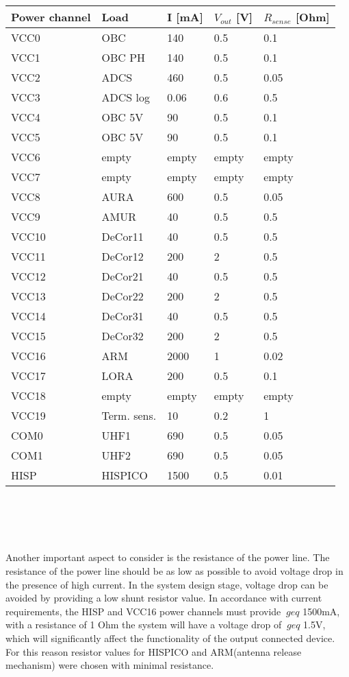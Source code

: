   
   \begin{tabular}{p{3cm}p{3cm}p{2cm}p{2cm}p{3cm}} \toprule
   	Power channel & Load & I [mA] & $V_{out}$ [V] & $R_{sense}$ [Ohm]\\ \midrule
   VCC0 & OBC & 140 & 0.5 & 0.1\\
   VCC1 & OBC PH & 140 & 0.5 & 0.1\\
   VCC2 & ADCS & 460 & 0.5 & 0.05\\
   VCC3 & ADCS log & 0.06 & 0.6 & 0.5\\
   VCC4 & OBC 5V & 90 & 0.5 & 0.1\\
   VCC5 & OBC 5V & 90 & 0.5 & 0.1\\
   VCC6 & empty & empty & empty & empty\\
   VCC7 & empty & empty & empty & empty\\
   VCC8 & AURA & 600 & 0.5 & 0.05\\
   VCC9 & AMUR & 40 & 0.5 & 0.5\\
   VCC10 & DeCor11 & 40 & 0.5 & 0.5\\
   VCC11 & DeCor12 & 200 & 2 & 0.5\\ 
   VCC12 & DeCor21 & 40 & 0.5 & 0.5\\ 
   VCC13 & DeCor22 & 200 & 2 & 0.5\\ 
   VCC14 & DeCor31 & 40 & 0.5 & 0.5\\ 
   VCC15 & DeCor32 & 200 & 2 & 0.5\\ 
   VCC16 & ARM & 2000 & 1 & 0.02\\
   VCC17 & LORA & 200 &  0.5 & 0.1\\
   VCC18 & empty & empty & empty & empty\\
   VCC19 & Term. sens. & 10 & 0.2 & 1\\
   COM0 & UHF1 & 690 & 0.5 & 0.05\\
   COM1 & UHF2 & 690 & 0.5 & 0.05\\
   	HISP & HISPICO & 1500 & 0.5& 0.01\\ 
    \bottomrule
   	
   \end{tabular}\\ \\ \\ \\
  \label{Tab:res}
 Another important aspect to consider is the resistance of the power line. The resistance of the power line should be as low as possible to avoid voltage drop in the presence of high current. In the system design stage, voltage drop can be avoided by providing a low shunt resistor value. In accordance with current requirements, the HISP and VCC16 power channels must provide $ \ geq $ 1500mA, with a resistance of 1 Ohm the system will have a voltage drop of $ \ geq $ 1.5V, which will significantly affect the functionality of the output connected device.
 For this reason resistor values for HISPICO and ARM(antenna release mechanism) were chosen with minimal resistance.\\ \\ 
 
